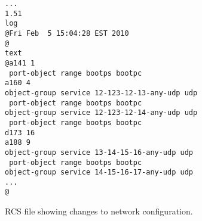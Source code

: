 \begin{figure}[t]
\lstset{language=CVS}
\centering
\begin{minipage}{0.9\linewidth}
\begin{lstlisting}
... 
1.51
log
@Fri Feb  5 15:04:28 EST 2010
@
text
@a141 1
 port-object range bootps bootpc
a160 4
object-group service 12-123-12-13-any-udp udp
 port-object range bootps bootpc
object-group service 12-123-12-14-any-udp udp
 port-object range bootps bootpc
d173 16
a188 9
object-group service 13-14-15-16-any-udp udp
 port-object range bootps bootpc
object-group service 14-15-16-17-any-udp udp
...
@
\end{lstlisting}
\end{minipage}
\caption{RCS file showing changes to network configuration.\label{fig:rcs_file}}
\end{figure}

